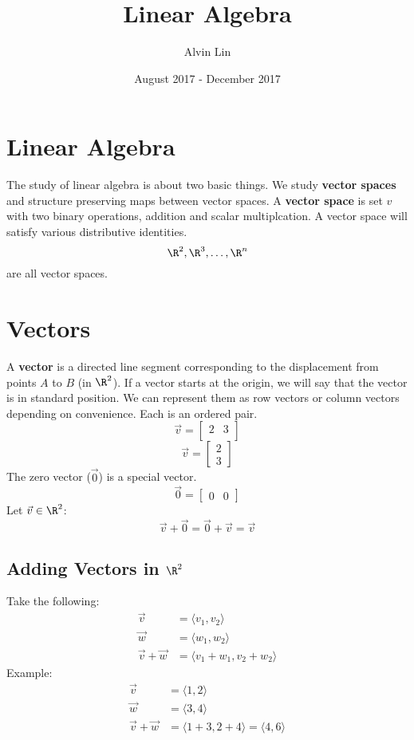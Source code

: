 \documentclass{math}
\title{Linear Algebra}
\author{Alvin Lin}
\date{August 2017 - December 2017}
\begin{document}
\maketitle

\section*{Linear Algebra}
The study of linear algebra is about two basic things. We study
\textbf{vector spaces} and structure preserving maps between vector
spaces. A \textbf{vector space} is set \( v \) with two binary operations,
addition and scalar multiplcation. A vector space will satisfy various
distributive identities.
\[ \R^2, \R^3, \dots, \R^n \]
are all vector spaces.

\section*{Vectors}
A \textbf{vector} is a directed line segment corresponding to the displacement
from points \( A \) to \( B \) (in \( \R^2 \)). If a vector starts at the
origin, we will say that the vector is in standard position. We can represent
them as row vectors or column vectors depending on convenience. Each is an
ordered pair.
\[ \vec{v} =
  \begin{bmatrix}
    2 & 3 \\
  \end{bmatrix} \]
\[ \vec{v} =
  \begin{bmatrix}
    2 \\
    3
  \end{bmatrix}
\]
The zero vector (\( \vec{0} \)) is a special vector.
\[ \vec{0} =
  \begin{bmatrix}
    0 & 0
  \end{bmatrix}
\]
Let \( \vec{v}\in\R^2 \):
\[ \vec{v}+\vec{0}=\vec{0}+\vec{v}=\vec{v} \]

\subsection*{Adding Vectors in \( \R^2 \)}
Take the following:
\begin{align*}
  \vec{v} &= \langle v_1,v_2\rangle \\
  \vec{w} &= \langle w_1,w_2\rangle \\
  \vec{v}+\vec{w} &= \langle v_1+w_1,v_2+w_2\rangle
\end{align*}
Example:
\begin{align*}
  \vec{v} &= \langle1,2\rangle \\
  \vec{w} &= \langle3,4\rangle \\
  \vec{v}+\vec{w} &= \langle1+3,2+4\rangle = \langle4,6\rangle
\end{align*}
\end{document}
